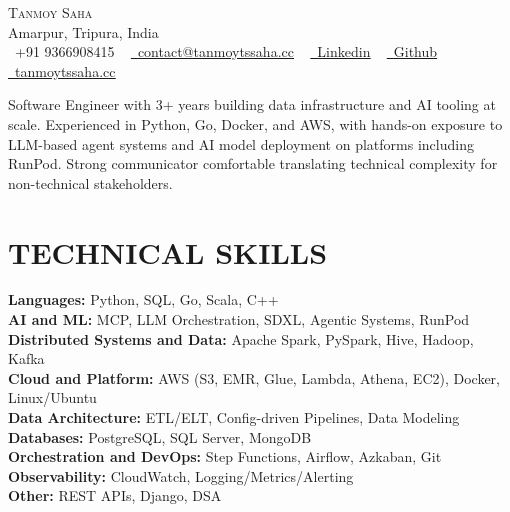 \documentclass[letterpaper,11pt]{article}
\begin{document}
\begin{center}
    {\Huge \scshape Tanmoy Saha} \\ \vspace{1pt}
    Amarpur, Tripura, India \\ \vspace{1pt}
    \small \raisebox{-0.1\height}\faPhone\ +91 9366908415 ~ 
    \href{mailto:contact@tanmoytssaha.cc}{\raisebox{-0.2\height}\faEnvelope\  \underline{contact@tanmoytssaha.cc}} ~ 
    \href{https://www.linkedin.com/in/tanmoytssaha/}{\raisebox{-0.2\height}\faLinkedin\ \underline{Linkedin}} ~
    \href{https://github.com/TanmoyTSSaha}{\raisebox{-0.2\height}\faGithub\ \underline{Github}} ~
    \href{https://www.tanmoytssaha.cc}{\raisebox{-0.2\height}\faGlobe\ \underline{tanmoytssaha.cc}}

\end{center}
    \vspace{0pt}

{Software Engineer with 3+ years building data infrastructure and AI tooling at scale. Experienced in Python, Go, Docker, and AWS, with hands-on exposure to LLM-based agent systems and AI model deployment on platforms including RunPod. Strong communicator comfortable translating technical complexity for non-technical stakeholders.}
  
\section{TECHNICAL SKILLS}
 \begin{itemize}[leftmargin=0.15in, label={}]
    \small{\item{
     \textbf{Languages: }{Python, SQL, Go, Scala, C++} \\
     \textbf{AI and ML: }{MCP, LLM Orchestration, SDXL, Agentic Systems, RunPod} \\
     \textbf{Distributed Systems and Data: }{Apache Spark, PySpark, Hive, Hadoop, Kafka} \\
     \textbf{Cloud and Platform: }{AWS (S3, EMR, Glue, Lambda, Athena, EC2), Docker, Linux/Ubuntu} \\
     \textbf{Data Architecture: }{ETL/ELT, Config-driven Pipelines, Data Modeling} \\
     \textbf{Databases: }{PostgreSQL, SQL Server, MongoDB} \\
     \textbf{Orchestration and DevOps: }{Step Functions, Airflow, Azkaban, Git} \\
     \textbf{Observability: }{CloudWatch, Logging/Metrics/Alerting} \\
     \textbf{Other: }{REST APIs, Django, DSA} \\
    }}
 \end{itemize}
 \vspace{-15pt}
\end{document}

